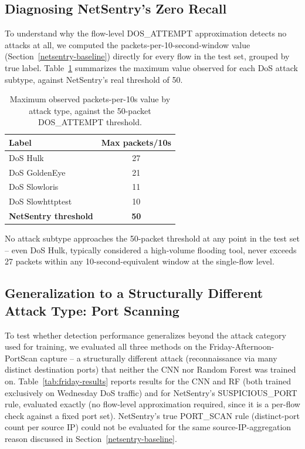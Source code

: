 \documentclass[conference]{IEEEtran}
\begin{document}
\subsection{Diagnosing NetSentry's Zero Recall}
\label{netsentry-diagnostic}
 
To understand why the flow-level DOS\_ATTEMPT approximation detects no attacks at all, we computed the packets-per-10-second-window value (Section~\ref{netsentry-baseline}) directly for every flow in the test set, grouped by true label. Table~\ref{tab:diagnostic} summarizes the maximum value observed for each DoS attack subtype, against NetSentry's real threshold of 50.
 
\begin{table}[htbp]
\caption{Maximum observed packets-per-10s value by attack type, against the 50-packet DOS\_ATTEMPT threshold.}
\begin{center}
\begin{tabular}{lc}
\toprule
\textbf{Label} & \textbf{Max packets/10s} \\
\midrule
DoS Hulk & 27 \\
DoS GoldenEye & 21 \\
DoS Slowloris & 11 \\
DoS Slowhttptest & 10 \\
\midrule
\textbf{NetSentry threshold} & \textbf{50} \\
\bottomrule
\end{tabular}
\label{tab:diagnostic}
\end{center}
\end{table}
 
No attack subtype approaches the 50-packet threshold at any point in the test set -- even DoS Hulk, typically considered a high-volume flooding tool, never exceeds 27 packets within any 10-second-equivalent window at the single-flow level.
 
\subsection{Generalization to a Structurally Different Attack Type: Port Scanning}
\label{friday-generalization}
 
To test whether detection performance generalizes beyond the attack category used for training, we evaluated all three methods on the Friday-Afternoon-PortScan capture -- a structurally different attack (reconnaissance via many distinct destination ports) that neither the CNN nor Random Forest was trained on. Table~\ref{tab:friday-results} reports results for the CNN and RF (both trained exclusively on Wednesday DoS traffic) and for NetSentry's SUSPICIOUS\_PORT rule, evaluated exactly (no flow-level approximation required, since it is a per-flow check against a fixed port set). NetSentry's true PORT\_SCAN rule (distinct-port count per source IP) could not be evaluated for the same source-IP-aggregation reason discussed in Section~\ref{netsentry-baseline}.
 
\end{document}
